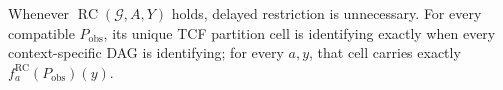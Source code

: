 Whenever \(\operatorname{RC}(\mathcal G,A,Y)\) holds, delayed restriction is unnecessary. For every compatible \(P_{\mathrm{obs}}\), its unique TCF partition cell is identifying exactly when every context-specific DAG is identifying; for every \(a,y\), that cell carries exactly \(f_a^{\mathrm{RC}}(P_{\mathrm{obs}})(y)\).